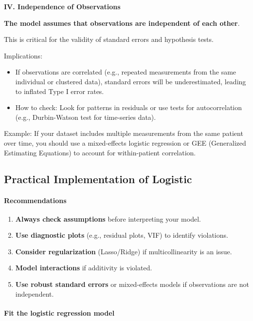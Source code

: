 \documentclass{article}
\providecommand{\tightlist}{%
  \setlength{\itemsep}{0pt}\setlength{\parskip}{0pt}}
\begin{document}
\medskip

\textbf{IV. Independence of Observations}

\textbf{The model assumes that observations are independent of each other}.

This is critical for the validity of standard errors and hypothesis tests.

Implications:

\begin{itemize}
\tightlist
\item
  If observations are correlated (e.g., repeated measurements from the
  same individual or clustered data), standard errors will be
  underestimated, leading to inflated Type I error rates.
\item
  How to check: Look for patterns in residuals or use tests for
  autocorrelation (e.g., Durbin-Watson test for time-series data).
\end{itemize}

Example: If your dataset includes multiple measurements from
the same patient over time, you should use a mixed-effects
logistic regression or GEE (Generalized Estimating Equations)
to account for within-patient correlation.

\subsection{Practical Implementation of Logistic}

\paragraph{Recommendations}

\begin{enumerate}
\tightlist
\item
  \textbf{Always check assumptions} before interpreting your model.
\item
  \textbf{Use diagnostic plots} (e.g., residual plots, VIF) to identify
  violations.
\item
  \textbf{Consider regularization} (Lasso/Ridge) if multicollinearity is
  an issue.
\item
  \textbf{Model interactions} if additivity is violated.
\item
  \textbf{Use robust standard errors} or mixed-effects models if
  observations are not independent.
\end{enumerate}


\paragraph{\texorpdfstring{\textbf{Fit the logistic regression
model}}{Fit the logistic regression model}}\label{fit-the-logistic-regression-model}
\end{document}
